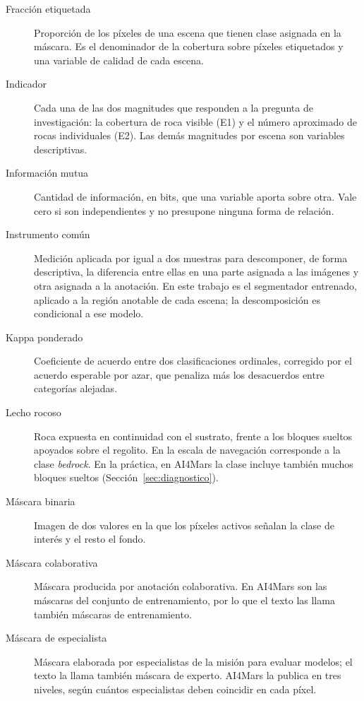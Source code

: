 {\begin{description}
  \item[Fracción etiquetada] Proporción de los píxeles de una escena que tienen
    clase asignada en la máscara. Es el denominador de la cobertura sobre píxeles
    etiquetados y una variable de calidad de cada escena.

  \item[Indicador] Cada una de las dos magnitudes que responden a la pregunta de
    investigación: la cobertura de roca visible (E1) y el número aproximado de rocas
    individuales (E2). Las demás magnitudes por escena son variables descriptivas.

  \item[Información mutua] Cantidad de información, en bits, que una variable aporta
    sobre otra. Vale cero si son independientes y no presupone ninguna forma de
    relación.

  \item[Instrumento común] Medición aplicada por igual a dos muestras para descomponer, de
    forma descriptiva, la diferencia entre ellas en una parte asignada a las imágenes y otra
    asignada a la anotación. En este trabajo es el segmentador entrenado, aplicado a la región
    anotable de cada escena; la descomposición es condicional a ese modelo.

  \item[Kappa ponderado] Coeficiente de acuerdo entre dos clasificaciones ordinales,
    corregido por el acuerdo esperable por azar, que penaliza más los desacuerdos
    entre categorías alejadas.

  \item[Lecho rocoso] Roca expuesta en continuidad con el sustrato, frente a los
    bloques sueltos apoyados sobre el regolito. En la escala de navegación
    corresponde a la clase \textit{bedrock}. En la práctica, en AI4Mars la clase
    incluye también muchos bloques sueltos (Sección~\ref{sec:diagnostico}).

  \item[Máscara binaria] Imagen de dos valores en la que los píxeles activos
    señalan la clase de interés y el resto el fondo.

  \item[Máscara colaborativa] Máscara producida por anotación colaborativa. En
    AI4Mars son las máscaras del conjunto de entrenamiento, por lo que el texto las
    llama también máscaras de entrenamiento.

  \item[Máscara de especialista] Máscara elaborada por especialistas de la misión
    para evaluar modelos; el texto la llama también máscara de experto. AI4Mars la
    publica en tres niveles, según cuántos especialistas deben coincidir en cada
    píxel.


\end{description}}
